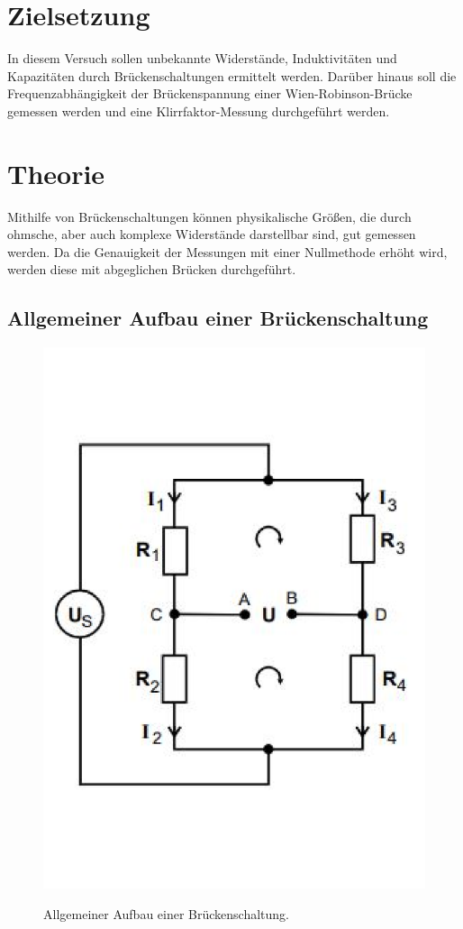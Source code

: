 \section{Zielsetzung}
\label{sec:Zielsetzung}
In diesem Versuch sollen unbekannte Widerstände, Induktivitäten und Kapazitäten durch Brückenschaltungen ermittelt werden.
Darüber hinaus soll die Frequenzabhängigkeit der Brückenspannung einer Wien-Robinson-Brücke gemessen werden und eine Klirrfaktor-Messung durchgeführt werden.
\section{Theorie}
\label{sec:Theorie}
Mithilfe von Brückenschaltungen können physikalische Größen, die durch ohmsche, aber auch komplexe Widerstände darstellbar sind, gut gemessen werden.
Da die Genauigkeit der Messungen mit einer Nullmethode erhöht wird, werden diese mit abgeglichen Brücken durchgeführt.

\subsection{Allgemeiner Aufbau einer Brückenschaltung}
\begin{figure}
    \centering
    \includegraphics[width=\textwidth]{BrückAllg.pdf}
    \label{fig:BrückAllg}
    \caption{Allgemeiner Aufbau einer Brückenschaltung.\cite[1]{anleitung}}
\end{figure}

